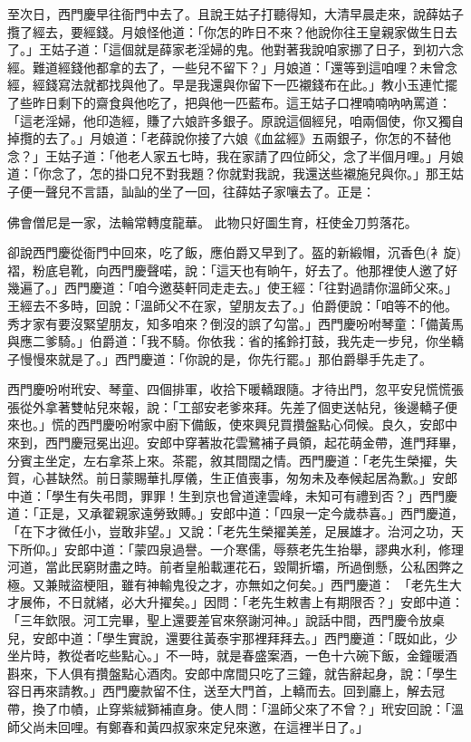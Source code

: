 至次日，西門慶早往衙門中去了。且說王姑子打聽得知，大清早晨走來，說薛姑子攬了經去，要經錢。月娘怪他道：「你怎的昨日不來？他說你往王皇親家做生日去了。」王姑子道：「這個就是薛家老淫婦的鬼。他對著我說咱家挪了日子，到初六念經。難道經錢他都拿的去了，一些兒不留下？」月娘道：「還等到這咱哩？未曾念經，經錢寫法就都找與他了。早是我還與你留下一匹襯錢布在此。」教小玉連忙擺了些昨日剩下的齋食與他吃了，把與他一匹藍布。這王姑子口裡喃喃吶吶罵道： 「這老淫婦，他印造經，賺了六娘許多銀子。原說這個經兒，咱兩個使，你又獨自掉攬的去了。」月娘道：「老薛說你接了六娘《血盆經》五兩銀子，你怎的不替他念？」王姑子道：「他老人家五七時，我在家請了四位師父，念了半個月哩。」月娘道：「你念了，怎的掛口兒不對我題？你就對我說，我還送些襯施兒與你。」那王姑子便一聲兒不言語，訕訕的坐了一回，往薛姑子家嚷去了。正是：

佛會僧尼是一家，法輪常轉度龍華。
此物只好圖生育，枉使金刀剪落花。

卻說西門慶從衙門中回來，吃了飯，應伯爵又早到了。盔的新緞帽，沉香色(衤旋)褶，粉底皂靴，向西門慶聲喏，說：「這天也有晌午，好去了。他那裡使人邀了好幾遍了。」西門慶道：「咱今邀葵軒同走走去。」使王經：「往對過請你溫師父來。」王經去不多時，回說：「溫師父不在家，望朋友去了。」伯爵便說：「咱等不的他。秀才家有要沒緊望朋友，知多咱來？倒沒的誤了勾當。」西門慶吩咐琴童：「備黃馬與應二爹騎。」伯爵道：「我不騎。你依我：省的搖鈴打鼓，我先走一步兒，你坐轎子慢慢來就是了。」西門慶道：「你說的是，你先行罷。」那伯爵舉手先走了。

西門慶吩咐玳安、琴童、四個排軍，收拾下暖轎跟隨。才待出門，忽平安兒慌慌張張從外拿著雙帖兒來報，說：「工部安老爹來拜。先差了個吏送帖兒，後邊轎子便來也。」慌的西門慶吩咐家中廚下備飯，使來興兒買攢盤點心伺候。良久，安郎中來到，西門慶冠冕出迎。安郎中穿著妝花雲鷺補子員領，起花萌金帶，進門拜畢，分賓主坐定，左右拿茶上來。茶罷，敘其間闊之情。西門慶道：「老先生榮擢，失賀，心甚缺然。前日蒙賜華扎厚儀，生正值喪事，匆匆未及奉候起居為歉。」安郎中道：「學生有失弔問，罪罪！生到京也曾道達雲峰，未知可有禮到否？」西門慶道：「正是，又承翟親家遠勞致賻。」安郎中道：「四泉一定今歲恭喜。」西門慶道，「在下才微任小，豈敢非望。」又說：「老先生榮擢美差，足展雄才。治河之功，天下所仰。」安郎中道：「蒙四泉過譽。一介寒儒，辱蔡老先生抬舉，謬典水利，修理河道，當此民窮財盡之時。前者皇船載運花石，毀閘折壩，所過倒懸，公私困弊之極。又兼賊盜梗阻，雖有神輸鬼役之才，亦無如之何矣。」西門慶道： 「老先生大才展佈，不日就緒，必大升擢矣。」因問：「老先生敕書上有期限否？」安郎中道：「三年欽限。河工完畢，聖上還要差官來祭謝河神。」說話中間，西門慶令放桌兒，安郎中道：「學生實說，還要往黃泰宇那裡拜拜去。」西門慶道：「既如此，少坐片時，教從者吃些點心。」不一時，就是春盛案酒，一色十六碗下飯，金鐘暖酒斟來，下人俱有攢盤點心酒肉。安郎中席間只吃了三鐘，就告辭起身，說：「學生容日再來請教。」西門慶款留不住，送至大門首，上轎而去。回到廳上，解去冠帶，換了巾幘，止穿紫絨獅補直身。使人問：「溫師父來了不曾？」玳安回說：「溫師父尚未回哩。有鄭春和黃四叔家來定兒來邀，在這裡半日了。」

